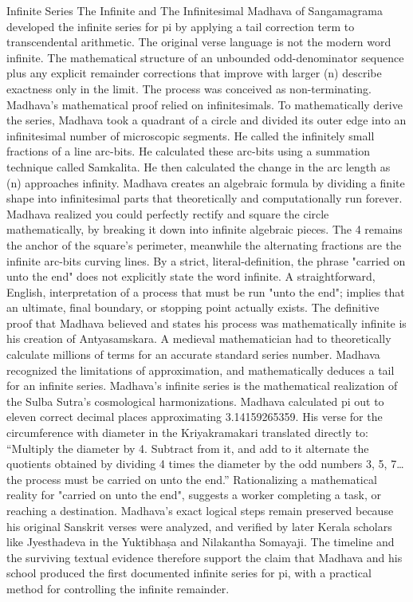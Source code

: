 {Infinite Series
The Infinite and The Infinitesimal
Madhava of Sangamagrama developed the infinite series for pi by applying a tail correction term to transcendental arithmetic. The original verse language is not the modern word infinite. The mathematical structure of an unbounded odd-denominator sequence plus any explicit remainder corrections that improve with larger (n) describe exactness only in the limit. The process was conceived as non-terminating. Madhava's mathematical proof relied on infinitesimals. 
To mathematically derive the series, Madhava took a quadrant of a circle and divided its outer edge into an infinitesimal number of microscopic segments. He called the infinitely small fractions of a line arc-bits. He calculated these arc-bits using a summation technique called Samkalita. He then calculated the change in the arc length as (n) approaches infinity. Madhava creates an algebraic formula by dividing a finite shape into infinitesimal parts that theoretically and computationally run forever. Madhava realized you could perfectly rectify and square the circle mathematically, by breaking it down into infinite algebraic pieces. The 4 remains the anchor of the square’s perimeter, meanwhile the alternating fractions are the infinite arc-bits curving lines. 
By a strict, literal-definition, the phrase "carried on unto the end" does not explicitly state the word infinite. A straightforward, English, interpretation of a process that must be run "unto the end"; implies that an ultimate, final boundary, or stopping point actually exists. The definitive proof that Madhava believed and states his process was mathematically infinite is his creation of Antyasamskara. A medieval mathematician had to theoretically calculate millions of terms for an accurate standard series number. Madhava recognized the limitations of approximation, and mathematically deduces a tail for an infinite series. Madhava’s infinite series is the mathematical realization of the Sulba Sutra’s cosmological harmonizations. Madhava calculated pi out to eleven correct decimal places approximating 3.14159265359. His verse for the circumference with diameter in the Kriyakramakari translated directly to:
“Multiply the diameter by 4. Subtract from it, and add to it alternate the quotients obtained by dividing 4 times the diameter by the odd numbers 3, 5, 7… the process must be carried on unto the end.”
Rationalizing a mathematical reality for "carried on unto the end", suggests a worker completing a task, or reaching a destination. Madhava’s exact logical steps remain preserved because his original Sanskrit verses were analyzed, and verified by later Kerala scholars like Jyesthadeva in the Yuktibhaṣa and Nilakantha Somayaji. The timeline and the surviving textual evidence therefore support the claim that Madhava and his school produced the first documented infinite series for pi, with a practical method for controlling the infinite remainder.  
}
